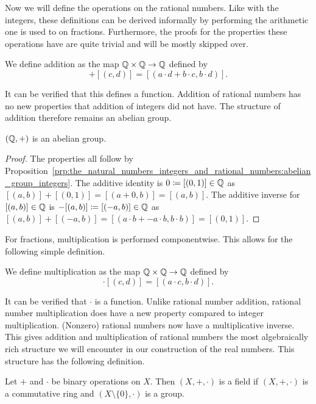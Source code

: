 \documentclass[../main.tex]{subfiles}
\begin{document}
Now we will define the operations on the rational numbers. Like with the integers, these definitions can be derived informally by performing the arithmetic one is used to on fractions. Furthermore, the proofs for the properties these operations have are quite trivial and will be mostly skipped over.
\begin{definition}
    We define addition as the map $\mathbb{Q}\times\mathbb{Q}\to\mathbb{Q}$ defined by
    \begin{equation*}
        [(a,b)]+[(c,d)]=[(a\cdot d+b\cdot c,b\cdot d)].
    \end{equation*}
\end{definition}
It can be verified that this defines a function. Addition of rational numbers has no new properties that addition of integers did not have. The structure of addition therefore remains an abelian group.
\begin{proposition}\label{prp:the_natural_numbers_integers_and_rational_numbers:abelian_group_rational_numbers}
    $(\mathbb{Q},+)$ is an abelian group.
\end{proposition}
\begin{proof}
    The properties all follow by Proposition~\ref{prp:the_natural_numbers_integers_and_rational_numbers:abelian_group_integers}. The additive identity is $0\coloneq[(0,1)]\in\mathbb{Q}$ as $[(a,b)]+[(0,1)]=[(a+0,b)]=[(a,b)]$. The additive inverse for $[(a,b)]\in\mathbb{Q}$ is $-[(a,b)]\coloneq[(-a,b)]\in\mathbb{Q}$ as $[(a,b)]+[(-a,b)]=[(a\cdot b+-a\cdot b,b\cdot b)]=[(0,1)]$.
\end{proof}
For fractions, multiplication is performed componentwise. This allows for the following simple definition.
\begin{definition}
    We define multiplication as the map $\mathbb{Q}\times\mathbb{Q}\to\mathbb{Q}$ defined by
    \begin{equation*}
        [(a,b)]\cdot[(c,d)]=[(a\cdot c,b\cdot d)].
    \end{equation*}
\end{definition}
It can be verified that $\cdot$ is a function. Unlike rational number addition, rational number multiplication does have a new property compared to integer multiplication. (Nonzero) rational numbers now have a multiplicative inverse. This gives addition and multiplication of rational numbers the most algebraically rich structure we will encounter in our construction of the real numbers. This structure has the following definition.
\begin{definition}[Field]
    Let $+$ and $\cdot$ be binary operations on $X$. Then $(X,+,\cdot)$ is a field if $(X,+,\cdot)$ is a commutative ring and $(X\setminus\{0\},\cdot)$ is a group.
\end{definition}
\end{document}
